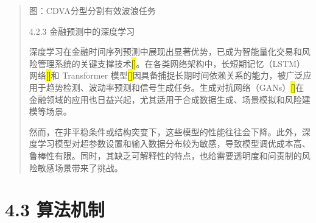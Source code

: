 \documentclass[UTF8]{ctexart}
\begin{document}
\begin{quote}
图：CDVA分型分割有效波浪任务

4.2.3 金融预测中的深度学习

深度学习在金融时间序列预测中展现出显著优势，已成为智能量化交易和风险管理系统的关键支撑技术\hl{{[}{]}}。在各类网络架构中，长短期记忆（LSTM）网络\hl{{[}{]}}和
Transformer
模型\hl{{[}{]}}因具备捕捉长期时间依赖关系的能力，被广泛应用于趋势检测、波动率预测和信号生成任务。生成对抗网络（GANs）\hl{{[}{]}}在金融领域的应用也日益兴起，尤其适用于合成数据生成、场景模拟和风险建模等场景。

然而，在非平稳条件或结构突变下，这些模型的性能往往会下降。此外，深度学习模型对超参数设置和输入数据分布较为敏感，导致模型调优成本高、鲁棒性有限。同时，其缺乏可解释性的特点，也给需要透明度和问责制的风险敏感场景带来了挑战。
\end{quote}

\section{4.3 算法机制}\label{ux7b97ux6cd5ux673aux5236}
\end{document}
